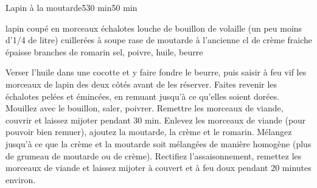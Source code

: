 \begin{recette}{Lapin à la moutarde}{5}{30 min}{50 min}
\begin{ingredients}[6 pers.]
 lapin coupé en morceaux
 échalotes
 louche de bouillon de volaille (un peu moins d'1/4 de litre)
 cuillerées à soupe rase de moutarde à l'ancienne
 cl de crème fraiche épaisse
 branches de romarin
\ingredient sel, poivre, huile, beurre
\end{ingredients}

\begin{preparation}
\etape Verser l'huile dans une cocotte et y faire fondre le beurre, puis saisir à feu vif les morceaux de lapin des deux côtés avant de les réserver.
\etape Faites revenir les échalotes pelées et émincées, en remuant jusqu'à ce qu'elles soient dorées.
\etape Mouillez avec le bouillon, saler, poivrer. Remettre les morceaux de viande, couvrir et laissez mijoter pendant 30 min.
\etape Enlevez les morceaux de viande (pour pouvoir bien remuer), ajoutez la moutarde, la crème et le romarin. Mélangez jusqu'à ce que la crème et la moutarde soit mélangées de manière homogène (plus de grumeau de moutarde ou de crème). 
\etape Rectifiez l'assaisonnement, remettez les morceaux de viande et laissez mijoter à couvert et à feu doux pendant 20 minutes environ.
\end{preparation}
\end{recette}

